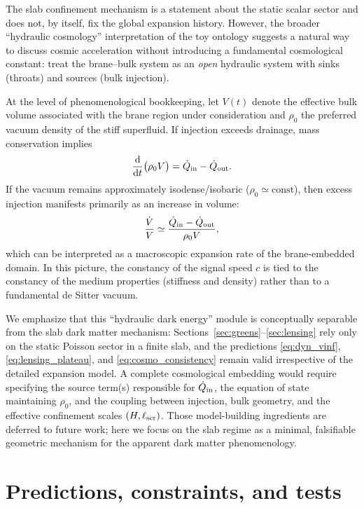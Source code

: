 \documentclass[11pt]{article}
\newcommand{\dd}{\mathrm{d}}
\begin{document}
The slab confinement mechanism is a statement about the static scalar sector and does not, by itself,
fix the global expansion history.  However, the broader ``hydraulic cosmology'' interpretation of the
toy ontology suggests a natural way to discuss cosmic acceleration without introducing a fundamental
cosmological constant: treat the brane--bulk system as an \emph{open} hydraulic system with sinks
(throats) and sources (bulk injection).

At the level of phenomenological bookkeeping, let $V(t)$ denote the effective bulk volume associated
with the brane region under consideration and $\rho_0$ the preferred vacuum density of the stiff
superfluid.  If injection exceeds drainage, mass conservation implies
\begin{equation}
  \frac{\dd}{\dd t}\bigl(\rho_0 V\bigr) = \dot{Q}_{\rm in}-\dot{Q}_{\rm out}.
\end{equation}
If the vacuum remains approximately isodense/isobaric ($\rho_0\simeq \mathrm{const}$), then excess
injection manifests primarily as an increase in volume:
\begin{equation}
  \frac{\dot{V}}{V} \simeq \frac{\dot{Q}_{\rm in}-\dot{Q}_{\rm out}}{\rho_0 V},
\end{equation}
which can be interpreted as a macroscopic expansion rate of the brane-embedded domain.
In this picture, the constancy of the signal speed $c$ is tied to the constancy of the medium
properties (stiffness and density) rather than to a fundamental de Sitter vacuum.

We emphasize that this ``hydraulic dark energy'' module is conceptually separable from the slab dark
matter mechanism:
Sections~\ref{sec:greens}--\ref{sec:lensing} rely only on the static Poisson sector in a finite slab,
and the predictions \eqref{eq:dyn_vinf}, \eqref{eq:lensing_plateau}, and
\eqref{eq:cosmo_consistency} remain valid irrespective of the detailed expansion model.
A complete cosmological embedding would require specifying the source term(s) responsible for
$\dot{Q}_{\rm in}$, the equation of state maintaining $\rho_0$, and the coupling between injection,
bulk geometry, and the effective confinement scales $(H,\ell_{\rm scr})$.
Those model-building ingredients are deferred to future work; here we focus on the slab regime as a
minimal, falsifiable geometric mechanism for the apparent dark matter phenomenology.

\section{Predictions, constraints, and tests}
\label{sec:tests}
\end{document}
